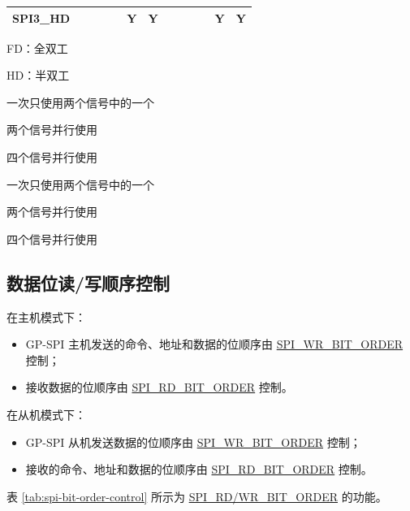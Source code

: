 \documentclass[main\_\_CN.tex]{subfiles}
\begin{document}
\begin{landscape}
\begin{table}[H]
\begin{threeparttable}
\begin{tabular}{ |p{2.0cm} |c|c|c|c|c|c|c|c|c|c|c|c| }
SPI3\_HD                   &         &         &         &         & Y\tnote{5}      & Y      &         &        &         &         & Y\tnote{8}       & Y      \\ \hline
\end{tabular}
        \begin{tablenotes}
                \item[1] FD：全双工
                \item[2] HD：半双工
                \item[3] 一次只使用两个信号中的一个
                \item[4] 两个信号并行使用
                \item[5] 四个信号并行使用
                \item[6] 一次只使用两个信号中的一个
                \item[7] 两个信号并行使用
                \item[8] 四个信号并行使用
        \end{tablenotes}
     \end{threeparttable}
    \end{table}

\end{landscape}

\subsection{数据位读/写顺序控制}
在主机模式下：

\begin{itemize}
    \item GP-SPI 主机发送的命令、地址和数据的位顺序由  \hyperref[fielddesc:SPIWRBITORDER]{SPI\_WR\_BIT\_ORDER} 控制；
    \item 接收数据的位顺序由  \hyperref[fielddesc:SPIRDBITORDER]{SPI\_RD\_BIT\_ORDER} 控制。
\end{itemize}


在从机模式下：

\begin{itemize}
    \item GP-SPI 从机发送数据的位顺序由  \hyperref[fielddesc:SPIWRBITORDER]{SPI\_WR\_BIT\_ORDER} 控制；
    \item 接收的命令、地址和数据的位顺序由  \hyperref[fielddesc:SPIRDBITORDER]{SPI\_RD\_BIT\_ORDER} 控制。
\end{itemize}


表  \ref{tab:spi-bit-order-control} 所示为  \hyperref[fielddesc:SPIRDBITORDER]{SPI\_RD/WR\_BIT\_ORDER} 的功能。
\end{document}
